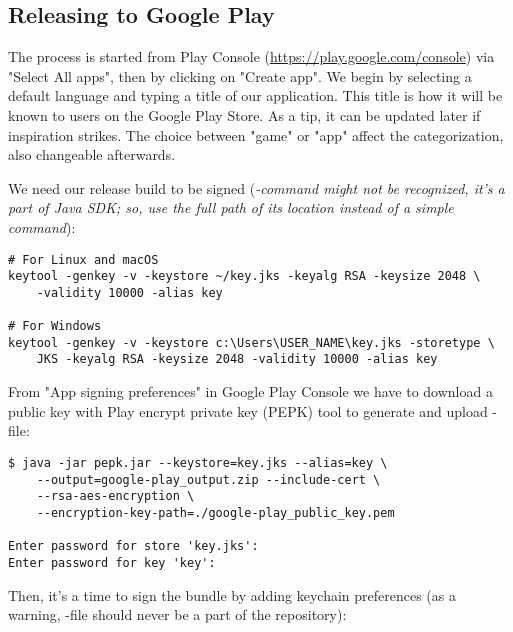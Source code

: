 
\subsection{Releasing to Google Play}

The process is started from Play Console (\href{https://play.google.com/console}{https://play.google.com/console}) 
via "Select All apps", then by clicking on "Create app". We begin by selecting a default language and typing a 
title of our application. This title is how it will be known to users on the Google Play Store. As a tip, it can be 
updated later if inspiration strikes. The choice between "game" or "app" affect the categorization, also changeable 
afterwards.

We need our release build to be signed (\emph{-command might not be recognized, it's a part of Java SDK; so,
use the full path of its location instead of a simple command}):

\begin{lstlisting}[language=terminal]
# For Linux and macOS
keytool -genkey -v -keystore ~/key.jks -keyalg RSA -keysize 2048 \
    -validity 10000 -alias key

# For Windows
keytool -genkey -v -keystore c:\Users\USER_NAME\key.jks -storetype \
    JKS -keyalg RSA -keysize 2048 -validity 10000 -alias key
\end{lstlisting}

\noindent From "App signing preferences" in Google Play Console we have to download a public key with Play encrypt 
private key (PEPK) tool to generate and upload -file:

\begin{lstlisting}[language=terminal]
$ java -jar pepk.jar --keystore=key.jks --alias=key \
    --output=google-play_output.zip --include-cert \
    --rsa-aes-encryption \
    --encryption-key-path=./google-play_public_key.pem 

Enter password for store 'key.jks':
Enter password for key 'key':
\end{lstlisting}

\noindent Then, it's a time to sign the bundle by adding keychain preferences (as a warning, -file 
should never be a part of the repository):

